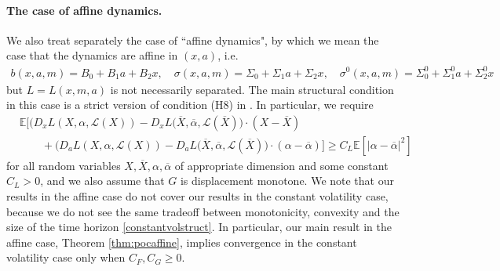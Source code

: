 \documentclass[11pt,reqno]{amsart}
\numberwithin{equation}{section}
\theoremstyle{definition}
\def\E{{\mathbb E}}
\newcommand{\sL}{\mathcal{L}}
\newcommand{\ov}{\overline}
\def \E{\mathbb{E}}
\begin{document}
\paragraph{\textbf{The case of affine dynamics}.} We also treat separately the case of ``affine dynamics", by which we mean the case that the dynamics are affine in $(x,a)$, i.e. 
\begin{align*}
b(x,a,m) = B_0 + B_1 a + B_2 x, \quad \sigma(x,a,m) = \Sigma_0 + \Sigma_1 a + \Sigma_2 x, \quad \sigma^0(x,a,m) = \Sigma^0_0 + \Sigma^0_1 a + \Sigma_2^0 x
\end{align*}
but $L = L(x,m,a)$ is not necessarily separated. The main structural condition in this case is a strict version of condition
(H8) in \cite{Mes-Mou21}. In particular, we require
\begin{align} \label{affinestructintro}
    &\E\Big[\Big(D_x L(X,\alpha,\sL(X)) - D_x L(\ov{X}, \ov{\alpha}, \sL(\ov{X}) \Big) \cdot (X - \ov{X}) \nonumber \\ &\qquad + \Big(D_a L(X,\alpha,\sL(X)) - D_a L(\ov{X}, \ov{\alpha}, \sL(\ov{X}) \Big) \cdot (\alpha - \ov{\alpha}) \Big] \geq C_L \E[|\alpha - \ov{\alpha}|^2]
\end{align}
for all random variables $X, \ov{X}, \alpha, \ov{\alpha}$ of appropriate dimension and some constant $C_L > 0$, and we also assume that $G$ is displacement monotone. We note that our results in the affine case do not cover our results in the constant volatility case, because we do not see the same tradeoff between monotonicity, convexity and the size of the time horizon \eqref{constantvolstruct}. In particular, our main result in the affine case, Theorem \ref{thm:pocaffine}, implies convergence in the constant volatility case only when $C_F, C_G \geq 0$. 
\newline
\end{document}

